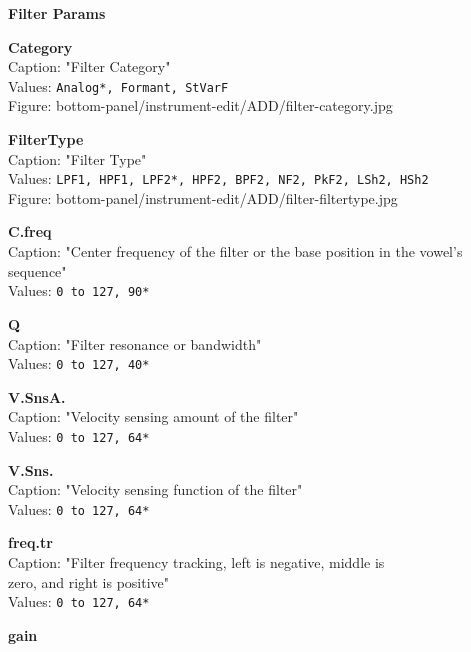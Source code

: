 \documentclass[
 11pt,
 twoside,
 a4paper,
 headinclude,
 footinclude,
 final                                 %
]{article}
\begin{document}
\begin{enumber}
\begin{enumber}
\begin{enumber}
\begin{enumber}
            \item \textbf{Filter Params}
            \begin{enumber}
               \item \textbf{Category} \\
                  Caption: "Filter Category" \\
                  Values: \texttt{Analog*, Formant, StVarF} \\
                  Figure: bottom-panel/instrument-edit/ADD/filter-category.jpg
               \item \textbf{FilterType} \\
                  Caption: "Filter Type" \\
                  Values: \texttt{LPF1, HPF1, LPF2*, HPF2, BPF2, NF2, PkF2,
                     LSh2, HSh2} \\
                  Figure: bottom-panel/instrument-edit/ADD/filter-filtertype.jpg
               \item \textbf{C.freq} \\
                  Caption: "Center frequency of the filter or the base position in
                     the vowel's sequence" \\
                  Values: \texttt{0 to 127, 90*}
               \item \textbf{Q} \\
                  Caption: "Filter resonance or bandwidth" \\
                  Values: \texttt{0 to 127, 40*}
               \item \textbf{V.SnsA.} \\
                  Caption: "Velocity sensing amount of the filter" \\
                  Values: \texttt{0 to 127, 64*}
               \item \textbf{V.Sns.} \\
                  Caption: "Velocity sensing function of the filter" \\
                  Values: \texttt{0 to 127, 64*}
               \item \textbf{freq.tr} \\
                  Caption: "Filter frequency tracking, left is negative, middle is \\
                     zero, and right is positive" \\
                  Values: \texttt{0 to 127, 64*}
               \item \textbf{gain} \\

\end{enumber}
\end{enumber}
\end{enumber}
\end{enumber}
\end{enumber}
\end{document}
